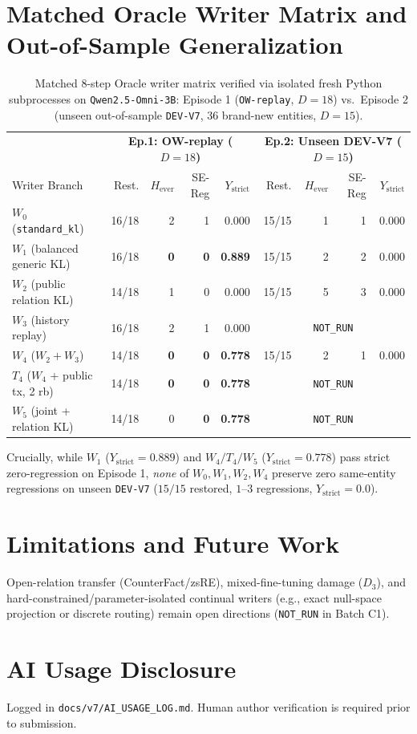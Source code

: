 \documentclass[11pt]{article}
\begin{document}
\section{Matched Oracle Writer Matrix and Out-of-Sample Generalization}
\begin{table}[t]
\centering\small
\caption{Matched 8-step Oracle writer matrix verified via isolated fresh Python subprocesses on \texttt{Qwen2.5-Omni-3B}: Episode 1 (\texttt{OW-replay}, $D=18$) vs.\ Episode 2 (unseen out-of-sample \texttt{DEV-V7}, 36 brand-new entities, $D=15$).}
\begin{tabular}{l|rrrr|rrrr}
\toprule
 & \multicolumn{4}{c|}{\textbf{Ep.1: OW-replay ($D=18$)}} & \multicolumn{4}{c}{\textbf{Ep.2: Unseen DEV-V7 ($D=15$)}} \\
Writer Branch & Rest. & $H_{\text{ever}}$ & SE-Reg & $Y_{\text{strict}}$ & Rest. & $H_{\text{ever}}$ & SE-Reg & $Y_{\text{strict}}$ \\
\midrule
$W_0$ (\texttt{standard\_kl}) & 16/18 & 2 & 1 & 0.000 & 15/15 & 1 & 1 & 0.000 \\
$W_1$ (balanced generic KL) & 16/18 & \textbf{0} & \textbf{0} & \textbf{0.889} & 15/15 & 2 & 2 & 0.000 \\
$W_2$ (public relation KL) & 14/18 & 1 & 0 & 0.000 & 15/15 & 5 & 3 & 0.000 \\
$W_3$ (history replay) & 16/18 & 2 & 1 & 0.000 & \multicolumn{4}{c}{\texttt{NOT\_RUN}} \\
$W_4$ ($W_2 + W_3$) & 14/18 & \textbf{0} & \textbf{0} & \textbf{0.778} & 15/15 & 2 & 1 & 0.000 \\
$T_4$ ($W_4$ + public tx, 2 rb) & 14/18 & \textbf{0} & \textbf{0} & \textbf{0.778} & \multicolumn{4}{c}{\texttt{NOT\_RUN}} \\
$W_5$ (joint + relation KL) & 14/18 & 0 & \textbf{0} & \textbf{0.778} & \multicolumn{4}{c}{\texttt{NOT\_RUN}} \\
\bottomrule
\end{tabular}
\end{table}

Crucially, while $W_1$ ($Y_{\text{strict}}=0.889$) and $W_4/T_4/W_5$ ($Y_{\text{strict}}=0.778$) pass strict zero-regression on Episode 1, \emph{none} of $W_0, W_1, W_2, W_4$ preserve zero same-entity regressions on unseen \texttt{DEV-V7} ($15/15$ restored, $1$--$3$ regressions, $Y_{\text{strict}}=0.0$).

\section{Limitations and Future Work}
Open-relation transfer (CounterFact/zsRE), mixed-fine-tuning damage ($D_3$), and hard-constrained/parameter-isolated continual writers (e.g., exact null-space projection or discrete routing) remain open directions (\texttt{NOT\_RUN} in Batch C1).

\section*{AI Usage Disclosure}
Logged in \texttt{docs/v7/AI\_USAGE\_LOG.md}. Human author verification is required prior to submission.



\end{document}
